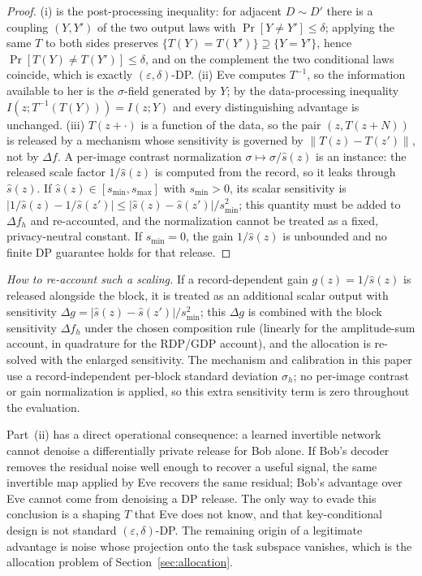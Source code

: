 \documentclass{ieeetj}
\theoremstyle{plain}
\theoremstyle{definition}
\begin{document}
\begin{proof}
(i) is the post-processing inequality: for adjacent $D\sim D'$ there is a
coupling $(Y,Y')$ of the two output laws with $\Pr[Y\neq Y']\le\delta$;
applying the same $T$ to both sides preserves
$\{T(Y)=T(Y')\}\supseteq\{Y=Y'\}$, hence
$\Pr[T(Y)\neq T(Y')]\le\delta$, and on the complement the two conditional
laws coincide, which is exactly $(\varepsilon,\delta)$-DP.
(ii) Eve computes $T^{-1}$, so the information available to her is the
$\sigma$-field generated by $Y$; by the data-processing inequality
$I(z;T^{-1}(T(Y)))=I(z;Y)$ and every distinguishing advantage is unchanged.
(iii) $T(z+\cdot)$ is a function of the data, so the pair
$(z,T(z+N))$ is released by a mechanism whose sensitivity is governed by
$\|T(z)-T(z')\|$, not by $\Delta f$. A per-image contrast normalization
$\sigma\mapsto\sigma/\widehat{s}(z)$ is an instance: the released scale factor
$1/\widehat{s}(z)$ is computed from the record, so it leaks through
$\widehat{s}(z)$. If $\widehat{s}(z)\in[s_{\min},s_{\max}]$ with $s_{\min}>0$,
its scalar sensitivity is
$|1/\widehat{s}(z)-1/\widehat{s}(z')|\le |\widehat{s}(z)-\widehat{s}(z')|/
s_{\min}^{2}$; this quantity must be added to $\Delta f_h$ and re-accounted,
and the normalization cannot be treated as a fixed, privacy-neutral constant.
If $s_{\min}=0$, the gain $1/\widehat{s}(z)$ is unbounded and no finite DP
guarantee holds for that release.
\end{proof}

\emph{How to re-account such a scaling.} If a record-dependent gain
$g(z)=1/\widehat{s}(z)$ is released alongside the block, it is treated as an
additional scalar output with sensitivity
$\Delta g=|\widehat{s}(z)-\widehat{s}(z')|/s_{\min}^{2}$; this $\Delta g$ is
combined with the block sensitivity $\Delta f_h$ under the chosen composition
rule (linearly for the amplitude-sum account, in quadrature for the RDP/GDP
account), and the allocation is re-solved with the enlarged sensitivity. The
mechanism and calibration in this paper use a record-independent per-block
standard deviation $\sigma_h$; no per-image contrast or gain normalization is
applied, so this extra sensitivity term is zero throughout the evaluation.

Part~(ii) has a direct operational consequence: a learned
invertible network cannot denoise a differentially private release for Bob
alone. If Bob's decoder removes the residual noise well enough to recover a
useful signal, the same invertible map applied by Eve recovers the same
residual; Bob's advantage over Eve cannot come from denoising a DP release. The
only way to evade this conclusion is a shaping $T$ that Eve does not know, and
that key-conditional design is not standard $(\varepsilon,\delta)$-DP. The
remaining origin of a legitimate advantage is noise whose projection onto the
task subspace vanishes, which is the allocation problem of
Section~\ref{sec:allocation}.
\end{document}

